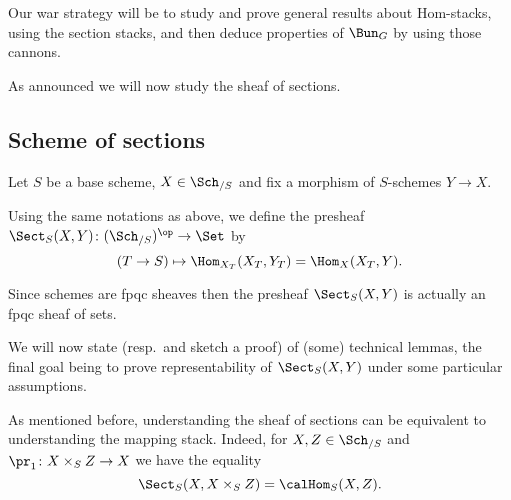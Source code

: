             Our war strategy will be to study and prove general results about Hom-stacks, using the section stacks, and then deduce properties of $\Bun_G$ by using those cannons.

            As announced we will now study the sheaf of sections.
        \subsection{Scheme of sections}
            Let $S$ be a base scheme, $X \in \Sch_{/S}$ and fix a morphism of $S$-schemes $Y \to X$.
            \begin{defn}
                Using the same notations as above, we define the presheaf $\Sect_S(X, Y)\colon (\Sch_{/S})^{\op} \to \Set$ by \[(T \to S) \mapsto \Hom_{X_T}(X_T, Y_T) = \Hom_X(X_T, Y). \]
            \end{defn}

            Since schemes are fpqc sheaves then the presheaf $\Sect_S(X, Y)$ is actually an fpqc sheaf of sets.

            We will now state (resp.\ and sketch a proof) of (some) technical lemmas, the final goal being to prove representability of $\Sect_S(X, Y)$ under some particular assumptions.

            \begin{example}
                \label{example:wang_3_1_2}
                As mentioned before, understanding the sheaf of sections can be equivalent to understanding the mapping stack. Indeed, for $X, Z \in \Sch_{/S}$ and $\pr_1\colon X \times_S Z \to X$ we have the equality \[\Sect_S(X, X \times_S Z) = \calHom_S(X, Z). \]
            \end{example}

